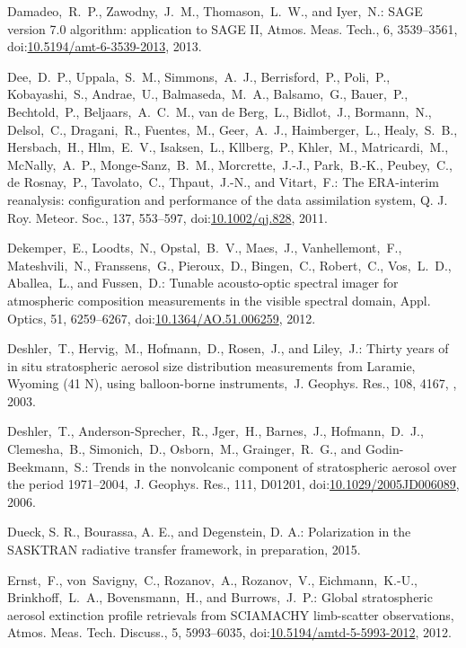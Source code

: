 \documentclass[amtd, online, hvmath]{copernicus}
\begin{document}
\begin{thebibliography}{99}
Damadeo,~R.~P., Zawodny,~J.~M., Thomason,~L.~W., and Iyer,~N.: SAGE version
7.0 algorithm: application to SAGE II, Atmos. Meas. Tech., 6, 3539--3561,
doi:\href{http://dx.doi.org/10.5194/amt-6-3539-2013}{10.5194/amt-6-3539-2013},
2013.



Dee,~D.~P., Uppala,~S.~M., Simmons,~A.~J., Berrisford,~P., Poli,~P.,
Kobayashi,~S., Andrae,~U., Balmaseda,~M.~A., Balsamo,~G., Bauer,~P.,
Bechtold,~P., Beljaars,~A.~C.~M., van de Berg,~L., Bidlot,~J., Bormann,~N.,
Delsol,~C., Dragani,~R., Fuentes,~M., Geer,~A.~J., Haimberger,~L.,
Healy,~S.~B., Hersbach,~H., Hlm,~E.~V., Isaksen,~L., Kllberg,~P., Khler,~M.,
Matricardi,~M., McNally,~A.~P., Monge-Sanz,~B.~M., Morcrette,~J.-J.,
Park,~B.-K., Peubey,~C., de Rosnay,~P., Tavolato,~C., Thpaut,~J.-N., and
Vitart,~F.: The ERA-interim reanalysis: configuration and performance of the
data assimilation system, Q. J. Roy. Meteor. Soc., 137, 553--597,
doi:\href{http://dx.doi.org/10.1002/qj.828}{10.1002/qj.828}, 2011.


Dekemper,~E., Loodts,~N., Opstal,~B.~V., Maes,~J., Vanhellemont,~F.,
Mateshvili,~N., Franssens,~G., Pieroux,~D., Bingen,~C., Robert,~C.,
Vos,~L.~D., Aballea,~L., and Fussen,~D.: Tunable acousto-optic spectral
imager for atmospheric composition measurements in the visible spectral
domain, Appl. Optics, 51, 6259--6267,
doi:\href{http://dx.doi.org/10.1364/AO.51.006259}{10.1364/AO.51.006259},
2012.


Deshler,~T., Hervig,~M., Hofmann,~D., Rosen,~J., and Liley,~J.: Thirty years
of in situ stratospheric aerosol size distribution measurements from Laramie,
Wyoming (41 N), using balloon-borne instruments,~J. Geophys. Res., 108, 4167,
, 2003.


Deshler,~T., Anderson-Sprecher,~R., Jger,~H., Barnes,~J., Hofmann,~D.~J.,
Clemesha,~B., Simonich,~D., Osborn,~M., Grainger,~R.~G., and
Godin-Beekmann,~S.: Trends in the nonvolcanic component of stratospheric
aerosol over the period 1971--2004,~J. Geophys. Res., 111, D01201,
doi:\href{http://dx.doi.org/10.1029/2005JD006089}{10.1029/2005JD006089},
2006.


Dueck, S. R., Bourassa, A. E., and Degenstein, D. A.: Polarization in the
SASKTRAN radiative transfer framework, in preparation, 2015.


Ernst,~F., von~Savigny,~C., Rozanov,~A., Rozanov,~V., Eichmann,~K.-U.,
Brinkhoff,~L.~A., Bovensmann,~H., and Burrows,~J.~P.: Global stratospheric
aerosol extinction profile retrievals from SCIAMACHY limb-scatter
observations, Atmos. Meas. Tech. Discuss., 5, 5993--6035,
doi:\href{http://dx.doi.org/10.5194/amtd-5-5993-2012}{10.5194/amtd-5-5993-2012},
2012.





\end{thebibliography}
\end{document}
